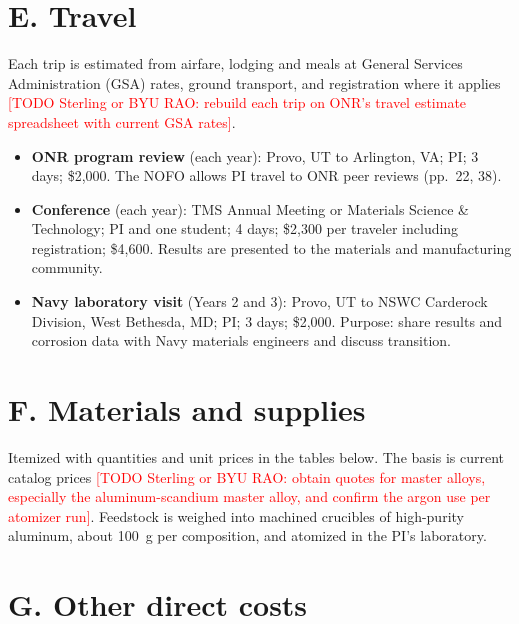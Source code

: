 \documentclass[11pt,letterpaper]{article}
\newcommand{\todo}[1]{\textcolor{red}{[TODO Sterling or BYU RAO: #1]}}
\begin{document}
\section*{E. Travel}

Each trip is estimated from airfare, lodging and meals at General Services
Administration (GSA) rates, ground transport, and registration where it
applies \todo{rebuild each trip on ONR's travel estimate spreadsheet with
current GSA rates}.
\begin{itemize}\setlength{\itemsep}{1pt}
\item \textbf{ONR program review} (each year): Provo, UT to Arlington, VA;
PI; 3 days; \$2,000. The NOFO allows PI travel to ONR peer reviews
(pp.~22, 38).
\item \textbf{Conference} (each year): TMS Annual Meeting or Materials Science
\& Technology; PI and one student; 4 days; \$2,300 per traveler including
registration; \$4,600. Results are presented to the materials and
manufacturing community.
\item \textbf{Navy laboratory visit} (Years 2 and 3): Provo, UT to NSWC
Carderock Division, West Bethesda, MD; PI; 3 days; \$2,000. Purpose: share
results and corrosion data with Navy materials engineers and discuss
transition.
\end{itemize}

\section*{F. Materials and supplies}

Itemized with quantities and unit prices in the tables below. The basis is
current catalog prices \todo{obtain quotes for master alloys, especially the
aluminum-scandium master alloy, and confirm the argon use per atomizer run}.
Feedstock is weighed into machined crucibles of high-purity aluminum, about
100~g per composition, and atomized in the PI's laboratory.

\section*{G. Other direct costs}
\end{document}
